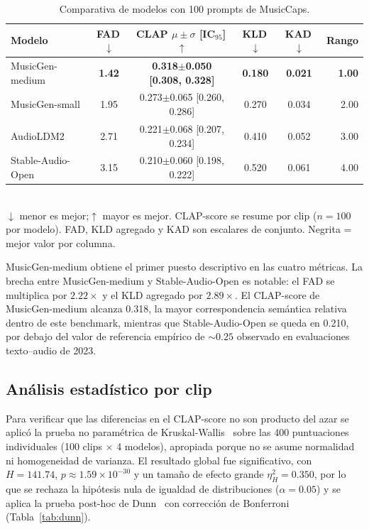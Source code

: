 \begin{table}[t]
  \caption{Comparativa de modelos con 100 prompts de MusicCaps.}
  \label{tab:benchmark}
  \centering
  \begin{tabular}{lccccr}
    \hline
    \textbf{Modelo} & \textbf{FAD\,$\downarrow$} &
    \textbf{CLAP $\mu\pm\sigma$ [IC$_{95}$]\,$\uparrow$} &
    \textbf{KLD\,$\downarrow$} & \textbf{KAD\,$\downarrow$} & \textbf{Rango} \\
    \hline
    MusicGen-medium   & \textbf{1.42} & \textbf{0.318$\pm$0.050 [0.308, 0.328]} & \textbf{0.180} & \textbf{0.021} & \textbf{1.00} \\
    MusicGen-small    & 1.95 & 0.273$\pm$0.065 [0.260, 0.286] & 0.270 & 0.034 & 2.00 \\
    AudioLDM2         & 2.71 & 0.221$\pm$0.068 [0.207, 0.234] & 0.410 & 0.052 & 3.00 \\
    Stable-Audio-Open & 3.15 & 0.210$\pm$0.060 [0.198, 0.222] & 0.520 & 0.061 & 4.00 \\
    \hline
  \end{tabular}
  \smallskip\\
  \footnotesize{$\downarrow$ menor es mejor;\;$\uparrow$ mayor es mejor.
  CLAP-score se resume por clip ($n=100$ por modelo). FAD, KLD agregado y KAD son
  escalares de conjunto. Negrita = mejor valor por columna.}
\end{table}

MusicGen-medium obtiene el primer puesto descriptivo en las cuatro métricas. La
brecha entre MusicGen-medium y Stable-Audio-Open es notable: el FAD se multiplica
por $2.22\times$ y el KLD agregado por $2.89\times$. El CLAP-score de
MusicGen-medium alcanza 0.318, la mayor correspondencia semántica relativa dentro
de este benchmark, mientras que Stable-Audio-Open se queda en 0.210, por debajo
del valor de referencia empírico de $\sim 0.25$ observado en evaluaciones
texto--audio de 2023.

\subsection{Análisis estadístico por clip}
\label{sec:benchmark:stats}

Para verificar que las diferencias en el CLAP-score no son producto del azar se
aplicó la prueba no paramétrica de Kruskal-Wallis~\cite{kruskal} sobre las 400
puntuaciones individuales (100 clips $\times$ 4 modelos), apropiada porque no se
asume normalidad ni homogeneidad de varianza. El resultado global fue
significativo, con $H = 141.74$, $p \approx 1.59 \times 10^{-30}$ y un tamaño de
efecto grande $\eta_H^2 = 0.350$, por lo que se rechaza la hipótesis nula de
igualdad de distribuciones ($\alpha = 0.05$) y se aplica la prueba post-hoc de
Dunn~\cite{dunn} con corrección de Bonferroni (Tabla~\ref{tab:dunn}).

